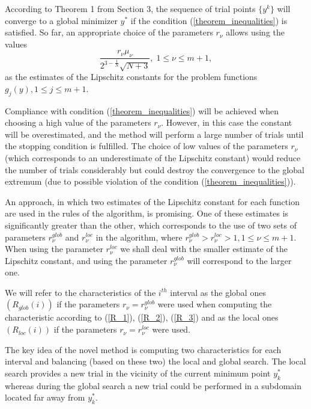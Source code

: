 \documentclass[preprint]{elsarticle}
\begin{document}
	According to Theorem 1 from Section 3, the sequence of trial points $\{y^k\}$ will converge to a global minimizer $y^\ast$ if the condition (\ref{theorem_inequalities}) is satisfied. So far, an appropriate choice of the parameters $r_{\nu}$ allows using the values
\begin{equation}\label{estimates_Lipschitz_constants}
	\frac{r_{\nu}\mu_{\nu}}{2^{3-\frac{1}{N}}\sqrt{N+3}}, \; 1 \leq \nu \leq m+1, 
\end{equation}
as the estimates of the Lipschitz constants for the problem functions $g_{j}(y), 1 \leq j \leq m+1$.

	Compliance with condition (\ref{theorem_inequalities}) will be achieved when choosing a high value of the parameters $r_{\nu}$. However, in this case the constant will be overestimated, and the method will perform a large number of trials until the stopping condition is fulfilled.
	The choice of low values of the parameters $r_{\nu}$ (which corresponds to an underestimate of the Lipschitz constant) would reduce the number of trials considerably but could destroy the convergence to the global extremum (due to possible violation of the condition (\ref{theorem_inequalities})).
	
	An approach, in which two estimates of the Lipschitz constant for each function are used in the rules of the algorithm, is promising. One of these estimates is significantly greater than the other, which corresponds to the use of two sets of parameters $r_{\nu}^{glob}$ and $r_{\nu}^{loc}$ in the algorithm, where $r_{\nu}^{glob}>r_{\nu}^{loc}>1, 1 \leq \nu \leq m+1$. When using the parameter $r_{\nu}^{loc}$ we shall deal with the smaller estimate of the Lipschitz constant, and using the parameter $r_{\nu}^{glob}$ will correspond to the larger one.
	
	We will refer to the characteristics of the $i^{th}$ interval as the global ones $(R_{glob}(i))$ if the parameters $r_{\nu}=r_{\nu}^{glob}$ were used when computing the characteristic according to (\ref{R_1}), (\ref{R_2}), (\ref{R_3}) and as the local ones  $(R_{loc}(i))$ if the parameters $r_{\nu}=r_{\nu}^{loc}$ were used. 

	The key idea of the novel method is computing two characteristics for each interval and balancing (based on these two) the local and global search. The local search provides a new trial in the vicinity of the current minimum point $y_k^\ast$  whereas during the global search a new trial could be performed in a subdomain located far away from $y_k^\ast$. 
	
\end{document}
